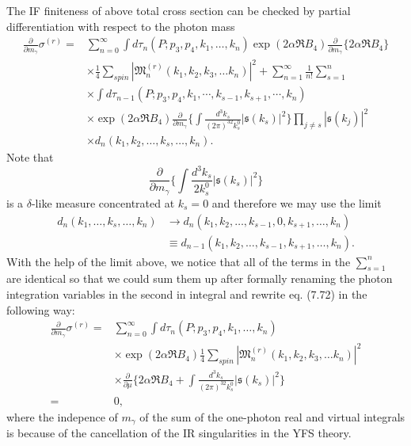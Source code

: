 The IF finiteness of above total cross section can be checked by partial differentiation with respect to the photon mass
\begin{align}
\frac{\partial}{\partial m_\gamma}\sigma^{(r)}=&\sum_{n=0}^{\infty}\int d\tau_n(P;p_3,p_4,k_1,\ldots,k_n)\exp(2\alpha\Re B_4)\frac{\partial}{\partial m_\gamma}\{2\alpha\Re B_4\}\nonumber\\
&\times\frac{1}{4}\sum_{spin}\left| \mathfrak{M}^{(r)}_n(k_1,k_2,k_3,\ldots k_n) \right|^2+\sum_{n=1}^{\infty}\frac{1}{n!}\sum_{s=1}^{n}\nonumber\\
&\times\int d\tau_{n-1}(P;p_3,p_4,k_1,\cdots,k_{s-1},k_{s+1},\cdots,k_n)\nonumber\\
&\times\exp(2\alpha\Re B_4)\frac{\partial}{\partial m_\gamma}\biggl\{ \int\frac{d^3k_s}{(2\pi)^32k^0_s}|\mathfrak{s}(k_s)|^2 \biggr\}\prod_{j\neq s}|\mathfrak{s}(k_j)|^2\nonumber\\
&\times d_n(k_1,k_2,\ldots,k_s,\ldots,k_n).
\end{align}
Note that 
\begin{equation*}
\frac{\partial}{\partial m_\gamma}\biggl\{ \int\frac{d^3k_s}{2k^0_s}|\mathfrak{s}(k_s)|^2 \biggr\}
\end{equation*}
is a $\delta$-like measure concentrated at $k_s=0$ and therefore we may use the limit
\begin{align*}
d_n(k_1,\ldots,k_s,\ldots,k_n)&\to d_n(k_1,k_2,\ldots,k_{s-1},0,k_{s+1},\ldots,k_n)\nonumber\\
&\equiv d_{n-1}(k_1,k_2,\ldots,k_{s-1},k_{s+1},\ldots,k_n).
\end{align*}
With the help of the limit above, we notice that all of the terms in the $\sum^n_{s=1}$ are identical so that we could sum them up after formally renaming the photon integration variables in the second in integral and rewrite eq. (7.72) in the following way:
\begin{align}
\frac{\partial}{\partial m_\gamma}\sigma^{(r)}=&\sum_{n=0}^{\infty}\int d\tau_n(P;p_3,p_4,k_1,\ldots,k_n)\nonumber\\
&\times\exp(2\alpha\Re B_4)\frac{1}{4}\sum_{spin}\left| \mathfrak{M}^{(r)}_n(k_1,k_2,k_3,\ldots k_n) \right|^2\nonumber\\
&\times\frac{\partial}{\partial \mu}\biggl\{ 2\alpha\Re B_4+\int\frac{d^3 k_s}{(2\pi)^32k^0_s}|\mathfrak{s}(k_s)|^2 \biggr\}\nonumber\\
=&0,
\end{align}
where the indepence of $m_\gamma$ of the sum of the one-photon real and virtual integrals is because of the cancellation of the IR singularities in the YFS theory. 

